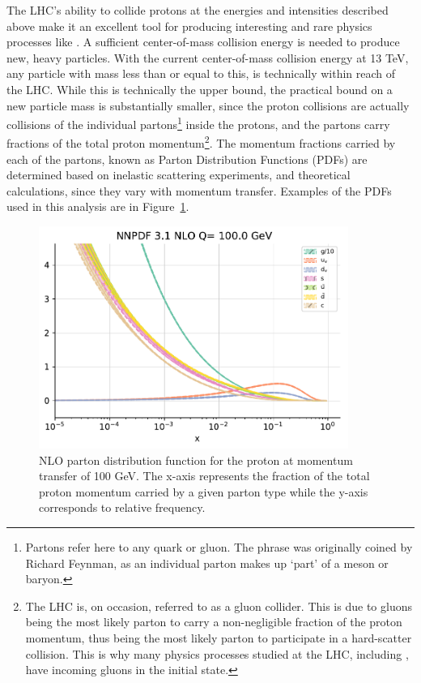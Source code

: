 The LHC's ability to collide protons at the energies and intensities described above make it an excellent tool for producing interesting
and rare physics processes like \tth.
A sufficient center-of-mass collision energy is needed to produce new, heavy particles.
With the current center-of-mass collision energy at 13 TeV, any particle with mass less than or equal to this, is 
technically within reach of the LHC. While this is technically the upper bound, the practical bound on a new particle mass is substantially smaller,
since the proton collisions are actually collisions of the individual partons\footnote{Partons refer here to any quark or gluon. The phrase was originally
coined by Richard Feynman, as an individual parton makes up `part' of a meson or baryon.} inside the protons, and the partons carry fractions of the total proton
momentum\footnote{The LHC is, on occasion, referred to as a gluon collider. This is due to gluons being the most likely parton to carry a non-negligible fraction of the proton momentum, thus
being the most likely parton to participate in a hard-scatter collision. This is why many physics processes studied at the LHC, including \tth, have incoming gluons in the initial state.}.
The momentum fractions carried by each of the partons, known as Parton Distribution Functions (PDFs) are determined based on inelastic scattering experiments, and theoretical calculations, since they
vary with momentum transfer. Examples of the PDFs used in this analysis are in Figure~\ref{fig:nnpdf}. 

\begin{figure}[hbtp]
 \begin{center}
   \includegraphics[width=0.9\textwidth]{ch3_figs/nnpdf3p1_nlo_q100.pdf}
   \caption[NLO parton distribution function for the proton at Q = 100 GeV]{NLO parton distribution function for the proton at momentum transfer of 100 GeV.
     The x-axis represents the fraction of the total proton momentum carried by a given parton type while the y-axis corresponds to relative
     frequency\cite{nnpdf3}.}
   \label{fig:nnpdf}
 \end{center}
\end{figure}

